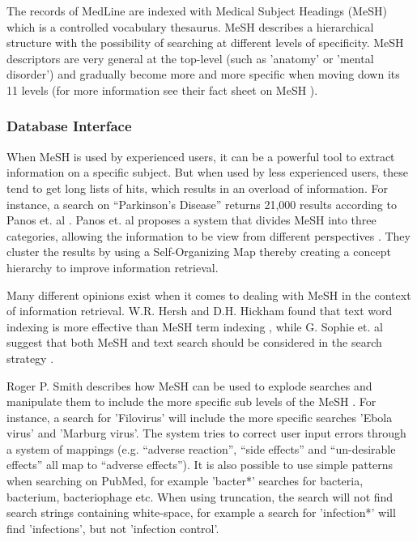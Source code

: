 The records of MedLine are indexed with Medical Subject Headings
(MeSH) which is a controlled vocabulary thesaurus. MeSH describes a
hierarchical structure with the possibility of searching at different
levels of specificity. MeSH descriptors are very general at the
top-level (such as 'anatomy' or 'mental disorder') and gradually
become more and more specific when moving down its 11 levels (for
more information see their fact sheet on MeSH \cite{FactSheetMeSH}).

\subsubsection{Database Interface}
When MeSH is used by experienced users, it can be a powerful tool to
extract information on a specific subject. But when used by less
experienced users, these tend to get long lists of hits, which results
in an overload of information. For instance, a search on ``Parkinson's
Disease'' returns 21,000 results according to Panos et. al
\cite{DataMiningBiomedicine}. Panos et. al proposes a system that
divides MeSH into three categories, allowing the information to be
view from different perspectives \cite{DataMiningBiomedicine}. They
cluster the results by using a Self-Organizing Map thereby creating a
concept hierarchy to improve information retrieval.

Many different opinions exist when it comes to dealing with
MeSH in the context of information retrieval. W.R. Hersh and
D.H. Hickham found that text word indexing is more effective than MeSH
term indexing \cite{RetrievalEffectiveness}, while G. Sophie et. al
suggest that both MeSH and text search should be considered in the
search strategy \cite{FDGPET}.

Roger P. Smith describes how MeSH can be used to explode searches and
manipulate them to include the more specific sub levels of the
MeSH \cite{TheInternetforPhysicians}. For instance, a search for 'Filovirus' will include the more
specific searches 'Ebola virus' and 'Marburg virus'. The system tries
to correct user input errors through a system of mappings
(e.g. ``adverse reaction'', ``side effects'' and ``un-desirable
effects'' all map to ``adverse effects''). It is also possible to use
simple patterns when searching on PubMed, for example 'bacter*'
searches for bacteria, bacterium, bacteriophage etc. When using
truncation, the search will not find search strings containing
white-space, for example a search for 'infection*' will find
'infections', but not 'infection control'.

